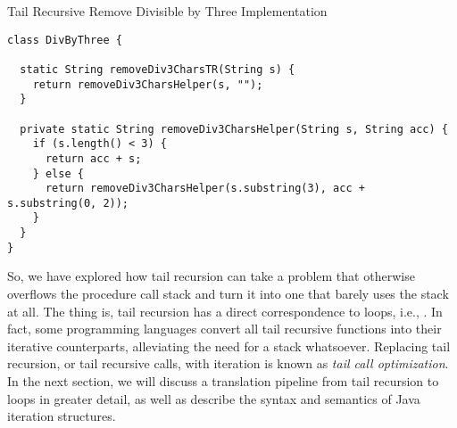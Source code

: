 \begin{cl}[]{Tail Recursive Remove Divisible by Three Implementation}
\begin{lstlisting}[language=MyJava]
class DivByThree {

  static String removeDiv3CharsTR(String s) {
    return removeDiv3CharsHelper(s, "");
  }

  private static String removeDiv3CharsHelper(String s, String acc) {
    if (s.length() < 3) {
      return acc + s;
    } else {
      return removeDiv3CharsHelper(s.substring(3), acc + s.substring(0, 2));
    }
  }
}
\end{lstlisting}
\end{cl}

So, we have explored how tail recursion can take a problem that otherwise overflows the procedure call stack and turn it into one that barely uses the stack at all. The thing is, tail recursion has a direct correspondence to loops, i.e., . In fact, some programming languages convert all tail recursive functions into their iterative counterparts, alleviating the need for a stack whatsoever. Replacing tail recursion, or tail recursive calls, with iteration is known as \textit{tail call optimization}. In the next section, we will discuss a translation pipeline from tail recursion to loops in greater detail, as well as describe the syntax and semantics of Java iteration structures.